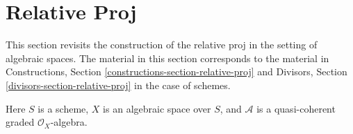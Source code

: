 \section{Relative Proj}
\label{section-relative-proj}

\noindent
This section revisits the construction of the relative proj
in the setting of algebraic spaces. The material in this section
corresponds to the material in Constructions, Section
\ref{constructions-section-relative-proj}
and Divisors, Section \ref{divisors-section-relative-proj}
in the case of schemes.

\begin{situation}
\label{situation-relative-proj}
Here $S$ is a scheme, $X$ is an algebraic space over $S$, and
$\mathcal{A}$ is a quasi-coherent graded $\mathcal{O}_X$-algebra.
\end{situation}

